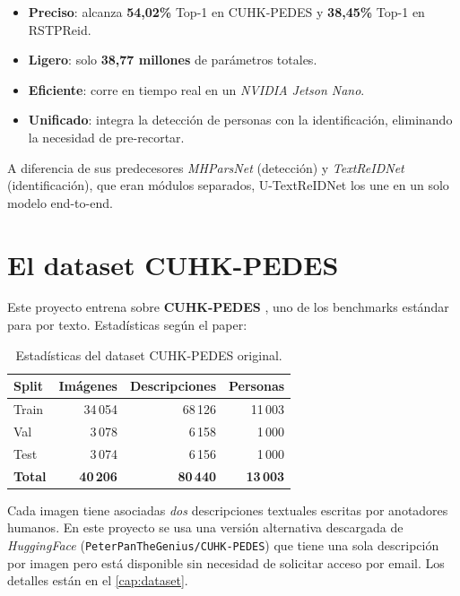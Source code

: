 \begin{itemize}
  \item \textbf{Preciso}: alcanza \textbf{54,02\%} Top-1 en
        CUHK-PEDES y \textbf{38,45\%} Top-1 en RSTPReid.
  \item \textbf{Ligero}: solo \textbf{38,77 millones} de
        parámetros totales.
  \item \textbf{Eficiente}: corre en tiempo real en un
        \emph{NVIDIA Jetson Nano}.
  \item \textbf{Unificado}: integra la detección de personas con
        la identificación, eliminando la necesidad de pre-recortar.
\end{itemize}

A diferencia de sus predecesores \emph{MHParsNet} (detección) y
\emph{TextReIDNet} (identificación), que eran módulos separados,
U-TextReIDNet los une en un solo modelo end-to-end.

\section{El dataset CUHK-PEDES}

Este proyecto entrena sobre \textbf{CUHK-PEDES}
\cite{li2017personsearch}, uno de los benchmarks estándar para
\reid{} por texto. Estadísticas según el paper:

\begin{table}[H]
\centering
\caption{Estadísticas del dataset CUHK-PEDES original.}
\label{tab:cuhkpedes-stats}
\begin{tabular}{lrrr}
\toprule
\textbf{Split} & \textbf{Imágenes} & \textbf{Descripciones} & \textbf{Personas} \\
\midrule
Train & 34\,054 & 68\,126 & 11\,003 \\
Val   &  3\,078 &  6\,158 &  1\,000 \\
Test  &  3\,074 &  6\,156 &  1\,000 \\
\midrule
\textbf{Total} & \textbf{40\,206} & \textbf{80\,440} & \textbf{13\,003} \\
\bottomrule
\end{tabular}
\end{table}

\noindent Cada imagen tiene asociadas \emph{dos} descripciones
textuales escritas por anotadores humanos. En este proyecto se usa
una versión alternativa descargada de \emph{HuggingFace}
(\texttt{PeterPanTheGenius/CUHK-PEDES}) que tiene una sola
descripción por imagen pero está disponible sin necesidad de
solicitar acceso por email. Los detalles están en el
\cref{cap:dataset}.

